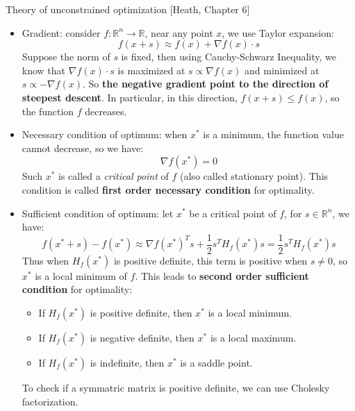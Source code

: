 \documentclass{report}
\begin{document}
Theory of unconstrained optimization [Heath, Chapter 6]
\begin{itemize}
	\item Gradient: consider $f: \mathbb{R}^n \to \mathbb{R}$, near any point $x$, we use Taylor expansion: 
	\begin{equation}
	f(x + s) \approx f(x) + \nabla f(x) \cdot s
	\end{equation} 
	Suppose the norm of $s$ is fixed, then using Cauchy-Schwarz Inequality, we know that $\nabla f(x) \cdot s$ is maximized at $s \propto \nabla f(x)$ and minimized at $s \propto -\nabla f(x)$. So \textbf{the negative gradient point to the direction of steepest descent}. In particular, in this direction, $f(x+s) \leq f(x)$, so the function $f$ decreases. 
	
	\item Necessary condition of optimum: when $x^*$ is a minimum, the function value cannot decrease, so we have: 
	\begin{equation}
	\nabla f(x^*) = 0
	\end{equation} 
	Such $x^*$ is called a \textit{critical point} of $f$ (also called stationary point). This condition is called \textbf{first order necessary condition} for optimality. 
	
	\item Sufficient condition of optimum: let $x^*$ be a critical point of $f$, for $s \in \mathbb{R}^n$, we have: 
	\begin{equation}
	f(x^* + s) - f(x^*) \approx \nabla f(x^*)^T s + \frac{1}{2} s^T H_f(x^*) s = \frac{1}{2} s^T H_f(x^*) s
	\end{equation}
	Thus when $H_f(x^*)$ is positive definite, this term is positive when $s \neq 0$, so $x^*$ is a local minimum of $f$. This leads to \textbf{second order sufficient condition} for optimality: 
	\begin{itemize}
		\item If $H_f(x^*)$ is positive definite, then $x^*$ is a local minimum. 
		\item If $H_f(x^*)$ is negative definite, then $x^*$ is a local maximum.
		\item If $H_f(x^*)$ is indefinite, then $x^*$ is a saddle point.  
	\end{itemize}
	To check if a symmatric matrix is positive definite, we can use Cholesky factorization. 
	

\end{itemize}
\end{document}

